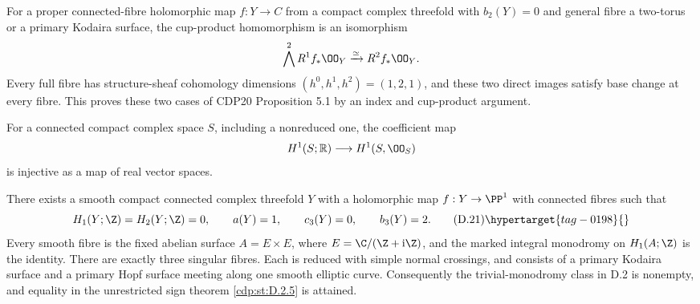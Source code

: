 \begin{proposition}\hypertarget{tag-01FX}{}\label{cdp:st:D.1.12}


For a proper connected-fibre holomorphic map $f:Y\to C$ from a
compact complex threefold with $b_2(Y)=0$ and general fibre a
two-torus or a primary Kodaira surface, the cup-product homomorphism
is an isomorphism
\[
\bigwedge^2R^1f_*\OO_Y\xrightarrow{\simeq}R^2f_*\OO_Y.
\]
Every full fibre has structure-sheaf cohomology dimensions
$(h^0,h^1,h^2)=(1,2,1)$, and these two direct images satisfy
base change at every fibre. This proves these two cases of CDP20
Proposition 5.1 by an index and cup-product argument.
\end{proposition}

\begin{proposition}\hypertarget{tag-01G5}{}\label{cdp:st:D.1.7}


For a connected compact complex space $S$, including a nonreduced
one, the coefficient map
\[
H^1(S;\mathbb R)\longrightarrow H^1(S,\OO_S)
\]
is injective as a map of real vector spaces.
\end{proposition}

\begin{proposition}\hypertarget{tag-01GE}{}\label{cdp:st:D.2.7}



There exists a smooth compact connected complex threefold $Y$
with a holomorphic map $f:Y\to\PP^1$ with connected fibres such
that
\[
 H_1(Y;\Z)=H_2(Y;\Z)=0,\qquad
 a(Y)=1,\qquad c_3(Y)=0,\qquad b_3(Y)=2.
\tag{D.21}\hypertarget{tag-0198}{}\label{cdp:eq:D.21}
\]
Every smooth fibre is the fixed abelian surface
$A=E\times E$, where $E=\C/(\Z+\mathrm i\Z)$, and the marked
integral monodromy on $H_1(A;\Z)$ is the identity. There are
exactly three singular fibres. Each is reduced with simple
normal crossings, and consists of a primary Kodaira surface
and a primary Hopf surface meeting along one smooth elliptic
curve. Consequently the trivial-monodromy class in D.2 is
nonempty, and equality in the unrestricted sign theorem
\ref{cdp:st:D.2.5} is attained.
\end{proposition}

